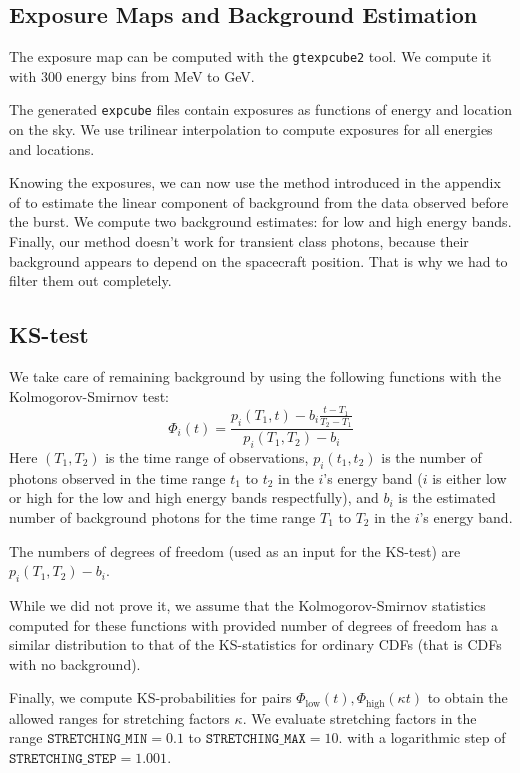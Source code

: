 \documentclass{article}
\begin{document}
\subsection{Exposure Maps and Background Estimation}

The exposure map can be computed with the \texttt{gtexpcube2} tool. We compute it with 300 energy bins from \unit[100]{MeV} to \unit[300]{GeV}.

The generated \texttt{expcube} files contain exposures as functions of energy and location on the sky. We use trilinear interpolation to compute exposures for all energies and locations.

Knowing the exposures, we can now use the method introduced in the appendix of \cite{Rubtsov:2011qq} to estimate the linear component of background from the data observed before the burst.
We compute two background estimates: for low and high energy bands.
Finally, our method doesn't work for transient class photons, because their background appears to depend on the spacecraft position.
That is why we had to filter them out completely.

\subsection{KS-test}

We take care of remaining background by using the following functions with the Kolmogorov-Smirnov test:
\begin{equation}
	\Phi_i\left(t\right) = \frac{p_i\left(T_1, t\right) - b_i \frac{t-T_1}{T_2-T_1}}{p_i\left(T_1, T_2\right) - b_i}
\end{equation}
Here $\left(T_1, T_2\right)$ is the time range of observations, $p_i\left(t_1, t_2\right)$ is the number of photons observed in the time range $t_1$ to $t_2$ in the $i$'s energy band ($i$ is either low or high for the low and high energy bands respectfully), and $b_i$ is the estimated number of background photons for the time range $T_1$ to $T_2$ in the $i$'s energy band.

The numbers of degrees of freedom (used as an input for the KS-test) are $p_i\left(T_1, T_2\right) - b_i$.

While we did not prove it, we assume that the Kolmogorov-Smirnov statistics computed for these functions with provided number of degrees of freedom has a similar distribution to that of the KS-statistics for ordinary CDFs (that is CDFs with no background).

Finally, we compute KS-probabilities for pairs $\Phi_\text{low}\left(t\right), \Phi_\text{high}\left(\kappa t\right)$ to obtain the allowed ranges for stretching factors $\kappa$. We evaluate stretching factors in the range $\texttt{STRETCHING\_MIN} = 0.1$ to $\texttt{STRETCHING\_MAX} = 10.$ with a logarithmic step of $\texttt{STRETCHING\_STEP} = 1.001$.
\end{document}
